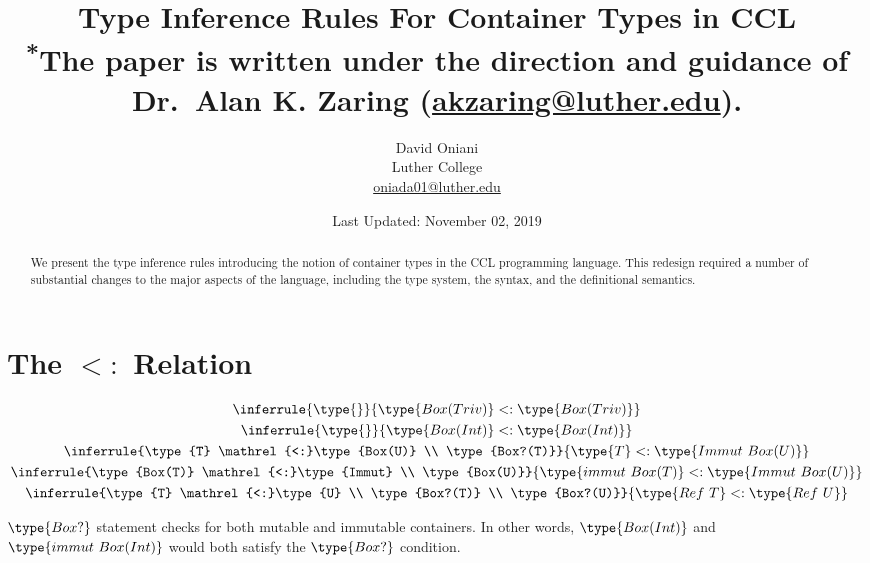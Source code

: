 \documentclass{article}
\author{David Oniani\\
        Luther College\\
        \href{mailto:oniada01@luther.edu}{oniada01@luther.edu}}
\title{\textbf{Type Inference Rules For Container Types in CCL}\\
       \medskip
       \small \textsuperscript{*}The paper is written under the direction and
       guidance of Dr.\ Alan K. Zaring
       (\href{mailto:akzaring@luther.edu}{akzaring@luther.edu}).}
\date{Last Updated: November 02, 2019}
\newcommand\subtype{\mathrel{<:}}
\begin{document}
\maketitle


\begin{abstract}
\noindent We present the type inference rules introducing the notion of
container types in the CCL programming language. This redesign required a
number of substantial changes to the major aspects of the language, including
the type system, the syntax, and the definitional semantics.
\end{abstract}


\section*{The $\subtype$ Relation}

\begin{gather}
  \inferrule{\type{}}{\type{Box(Triv)} \subtype \type{Box(Triv)}}\\
  \inferrule{\type{}}{\type{Box(Int)} \subtype \type{Box(Int)}}\\
  \inferrule{\type{T} \subtype \type{Box(U)} \\ \type{Box?(T)}}{\type{T} \subtype \type{Immut\ Box(U)}}\\
  \inferrule{\type{Box(T)} \subtype \type{Immut} \\ \type{Box(U)}}{\type{immut\ Box(T)} \subtype \type{Immut\ Box(U)}}\\
  \inferrule{\type{T} \subtype \type{U} \\ \type{Box?(T)} \\ \type{Box?(U)}}{\type{Ref\ T} \subtype \type{Ref\ U}}
\end{gather}

$\type{Box?}$ statement checks for both mutable and immutable containers.
In other words, $\type{Box(Int)}$ and $\type{immut\ Box(Int)}$ would both
satisfy the $\type{Box?}$ condition.

\end{document}
